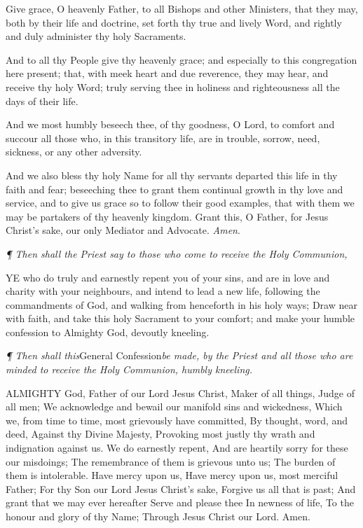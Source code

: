Give grace, O heavenly Father, to all Bishops and other
Ministers, that they may, both by their life and doctrine, set forth thy
true and lively Word, and rightly and duly administer thy holy Sacraments.

And to all thy People give thy heavenly grace; and
especially to this congregation here present; that, with meek heart and
due reverence, they may hear, and receive thy holy Word; truly serving
thee in holiness and righteousness all the days of their life.

And we most humbly beseech thee, of thy goodness, O
Lord, to comfort and succour all those who, in this transitory life, are
in trouble, sorrow, need, sickness, or any other adversity.

And we also bless thy holy Name for all thy servants
departed this life in thy faith and fear; beseeching thee to grant them
continual growth in thy love and service, and to give us grace so to follow
their good examples, that with them we may be partakers of thy heavenly
kingdom. Grant this, O Father, for Jesus Christ’s sake, our only
Mediator and Advocate. \emph{Amen}.

\emph{¶
Then shall the Priest say to those who come to receive the Holy Communion,}

YE
who do truly and earnestly repent you of your sins, and are in love and
charity with your neighbours, and intend to lead a new life, following
the commandments of God, and walking from henceforth in his holy ways;
Draw near with faith, and take this holy Sacrament to your comfort; and
make your humble confession to Almighty God, devoutly kneeling.

\emph{¶
Then shall this}General Confession\emph{be made, by the Priest and
all those who are minded to receive the Holy Communion, humbly kneeling.}

ALMIGHTY
God, Father of our Lord Jesus Christ, Maker of all things, Judge of all
men; We acknowledge and bewail our manifold sins and wickedness, Which
we, from time to time, most grievously have committed, By thought, word,
and deed, Against thy Divine Majesty, Provoking most justly thy wrath
and indignation against us. We do earnestly repent, And are heartily sorry
for these our misdoings; The remembrance of them is grievous unto us;
The burden of them is intolerable. Have mercy upon us, Have mercy upon
us, most merciful Father; For thy Son our Lord Jesus Christ’s sake,
Forgive us all that is past; And grant that we may ever hereafter Serve
and please thee In newness of life, To the honour and glory of thy Name;
Through Jesus Christ our Lord. Amen.

